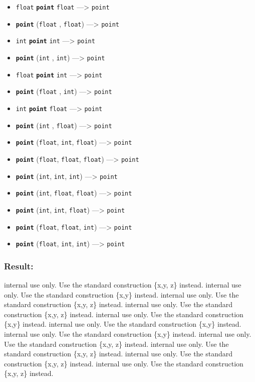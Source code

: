 \documentclass[]{book}
\providecommand{\tightlist}{%
  \setlength{\itemsep}{0pt}\setlength{\parskip}{0pt}}
\theoremstyle{definition}
\theoremstyle{definition}
\theoremstyle{definition}
\theoremstyle{remark}
\begin{document}
\begin{itemize}
\tightlist
\item
  \texttt{float} \textbf{\texttt{point}} \texttt{float}
  ---\textgreater{} \texttt{point}
\item
  \textbf{\texttt{point}} (\texttt{float} , \texttt{float})
  ---\textgreater{} \texttt{point}
\item
  \texttt{int} \textbf{\texttt{point}} \texttt{int} ---\textgreater{}
  \texttt{point}
\item
  \textbf{\texttt{point}} (\texttt{int} , \texttt{int})
  ---\textgreater{} \texttt{point}
\item
  \texttt{float} \textbf{\texttt{point}} \texttt{int} ---\textgreater{}
  \texttt{point}
\item
  \textbf{\texttt{point}} (\texttt{float} , \texttt{int})
  ---\textgreater{} \texttt{point}
\item
  \texttt{int} \textbf{\texttt{point}} \texttt{float} ---\textgreater{}
  \texttt{point}
\item
  \textbf{\texttt{point}} (\texttt{int} , \texttt{float})
  ---\textgreater{} \texttt{point}
\item
  \textbf{\texttt{point}} (\texttt{float}, \texttt{int}, \texttt{float})
  ---\textgreater{} \texttt{point}
\item
  \textbf{\texttt{point}} (\texttt{float}, \texttt{float},
  \texttt{float}) ---\textgreater{} \texttt{point}
\item
  \textbf{\texttt{point}} (\texttt{int}, \texttt{int}, \texttt{int})
  ---\textgreater{} \texttt{point}
\item
  \textbf{\texttt{point}} (\texttt{int}, \texttt{float}, \texttt{float})
  ---\textgreater{} \texttt{point}
\item
  \textbf{\texttt{point}} (\texttt{int}, \texttt{int}, \texttt{float})
  ---\textgreater{} \texttt{point}
\item
  \textbf{\texttt{point}} (\texttt{float}, \texttt{float}, \texttt{int})
  ---\textgreater{} \texttt{point}
\item
  \textbf{\texttt{point}} (\texttt{float}, \texttt{int}, \texttt{int})
  ---\textgreater{} \texttt{point}
\end{itemize}

\subsubsection{Result:}\label{result-394}

internal use only. Use the standard construction \{x,y, z\} instead.
internal use only. Use the standard construction \{x,y\} instead.
internal use only. Use the standard construction \{x,y, z\} instead.
internal use only. Use the standard construction \{x,y, z\} instead.
internal use only. Use the standard construction \{x,y\} instead.
internal use only. Use the standard construction \{x,y\} instead.
internal use only. Use the standard construction \{x,y\} instead.
internal use only. Use the standard construction \{x,y, z\} instead.
internal use only. Use the standard construction \{x,y, z\} instead.
internal use only. Use the standard construction \{x,y, z\} instead.
internal use only. Use the standard construction \{x,y, z\} instead.
\end{document}
